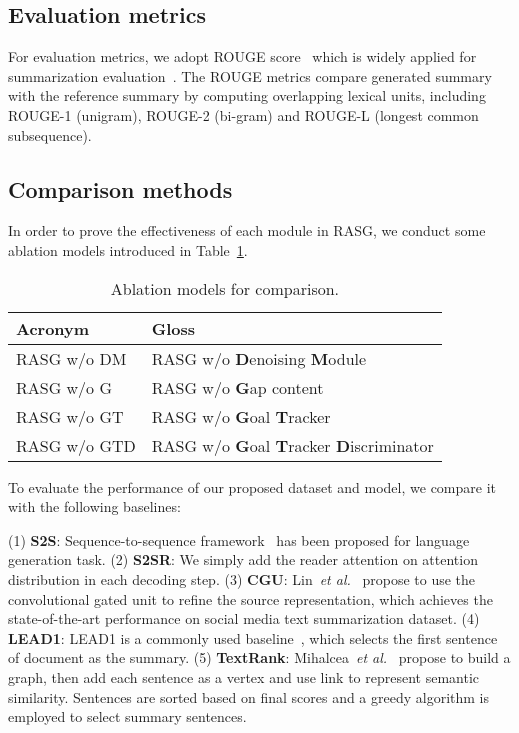 \documentclass[letterpaper]{article} \usepackage{aaai19}  \usepackage{times}  \usepackage{helvet}  \usepackage{courier}
\newcommand{\etal}{\emph{et al.}\xspace}
\begin{document}
\subsection{Evaluation metrics}

For evaluation metrics, we adopt ROUGE score~\cite{lin2004rouge} which is widely applied for summarization evaluation~\cite{Sun2018AUM,chen2018iterative}. 
The ROUGE metrics compare generated summary with the reference summary by computing overlapping lexical units, including ROUGE-1 (unigram), ROUGE-2 (bi-gram) and ROUGE-L (longest common subsequence). 

\subsection{Comparison methods}

In order to prove the effectiveness of each module in RASG, we conduct some ablation models introduced in Table~\ref{tab:ablations}.

\begin{table}[t]
\centering
\caption{Ablation models for comparison.}
\label{tab:ablations}
\small
\begin{tabular}{@{}l@{~}l}
\toprule
Acronym & Gloss \\
\midrule
RASG w/o DM &  \multicolumn{1}{p{5cm}}{\small RASG w/o \textbf{D}enoising \textbf{M}odule}\\
RASG w/o G &  \multicolumn{1}{p{5cm}}{\small RASG w/o \textbf{G}ap content}\\
RASG w/o GT &  \multicolumn{1}{p{5cm}}{\small RASG w/o \textbf{G}oal \textbf{T}racker}\\
RASG w/o GTD &  \multicolumn{1}{p{5cm}}{\footnotesize RASG w/o \textbf{G}oal \textbf{T}racker \textbf{D}iscriminator}\\
\bottomrule
\end{tabular}
\end{table}

To evaluate the performance of our proposed dataset and model, we compare it with the following baselines:

\noindent (1) \textbf{S2S}: Sequence-to-sequence framework~\cite{Sutskever2014SequenceTS} has been proposed for language generation task. 
\noindent (2) \textbf{S2SR}: We simply add the reader attention  on attention distribution  in each decoding step.
\noindent (3) \textbf{CGU}: Lin~\etal~ propose to use the convolutional gated unit to refine the source representation, which achieves the state-of-the-art performance on social media text summarization dataset.
\noindent (4) \textbf{LEAD1}: LEAD1 is a commonly used baseline~\cite{Nallapati2017SummaRuNNerAR,see2017get}, which selects the first sentence of document as the summary.
\noindent (5) \textbf{TextRank}: Mihalcea~\etal~ propose to build a graph, then add each sentence as a vertex and use link to represent semantic similarity. 
Sentences are sorted based on final scores and a greedy algorithm is employed to select summary sentences.
\end{document}
